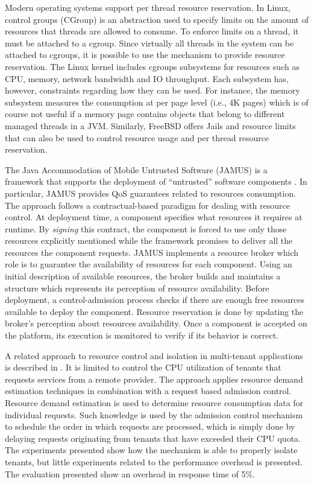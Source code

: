 Modern operating systems support per thread resource reservation.
In Linux, control groups (CGroup) \cite{Soltesz:2007:COS:1272998.1273025} is an abstraction used to specify limits on the amount of resources that threads are allowed to consume.
To enforce limits on a thread, it must be attached to a cgroup.
Since virtually all threads in the system can be attached to cgroups, it is possible to use the mechanism
to provide resource reservation.
The Linux kernel includes cgroups subsystems for resources such as CPU, memory, network bandwidth and IO throughput.
Each subsystem has, however, constraints regarding how they can be used.
For instance, the memory subsystem measures the consumption at per page level (i.e., 4K pages) which is of course not useful if a memory page contains objects that belong to different managed threads in a JVM. 
Similarly, FreeBSD offers Jails \cite{Kamp00jails:confining} and resource limits that can also be used to control resource usage and per thread resource reservation.

The Java Accommodation of Mobile Untrusted Software (JAMUS) is a framework that supports the deployment of ``untrusted'' software components \cite{JAMUS2002}.
In particular, JAMUS provides QoS guarantees related to resources consumption. 
The approach follows a contractual-based paradigm for dealing with resource control.
At deployment time, a component specifies what resources it requires at runtime.
By \textit{signing} this contract, the component is forced to use only those resources explicitly mentioned while the framework promises to deliver all the resources the component requests.
JAMUS implements a resource broker which role is to guarantee the availability of resources for each component.
Using an initial description of available resources, the broker builds and maintains a structure which represents its perception of resource availability.
Before deployment, a control-admission process checks if there are enough free resources available to deploy the component.
Resource reservation is done by updating the broker's perception about resources availability.
Once a component is accepted on the platform, its execution is monitored to verify if its behavior is correct.

A related approach to resource control and isolation in multi-tenant applications is described in \cite{KrSpAhKo2014_CCGrid_ResourceIsolation}.
It is limited to control the CPU utilization of tenants that requests services from a remote provider.
The approach applies resource demand estimation techniques in combination with a request based admission control.
Resource demand estimation is used to determine resource consumption data for individual requests.
Such knowledge is used by the admission control mechanism to schedule the order in which requests are processed, which is simply done by delaying requests originating from tenants that have exceeded their CPU quota.
The experiments presented show how the mechanism is able to properly isolate tenants, but little experiments related to the performance overhead is presented.
The evaluation presented show an overhead in response time of 5\%.

